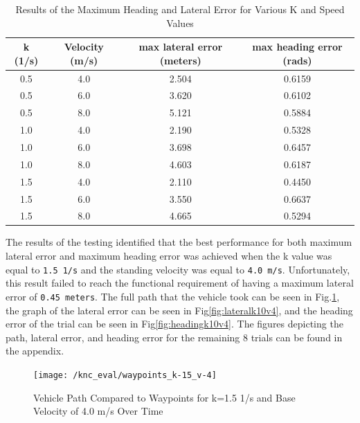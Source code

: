 \documentclass[titlepage,draft]{article}
\begin{document}
{\begin{table}
	\centering
	\begin{tabular}{| c | c | c | c |}
		\hline
		k (1/s) & Velocity (m/s) & max lateral error (meters) & max heading error (rads) \\ [0.5ex]
		\hline
		0.5     & 4.0            & 2.504                      & 0.6159                   \\
		\hline
		0.5     & 6.0            & 3.620                      & 0.6102                   \\
		\hline
		0.5     & 8.0            & 5.121                      & 0.5884                 \\
		\hline
		1.0     & 4.0            & 2.190                      & 0.5328                   \\
		\hline
		1.0     & 6.0            & 3.698                      & 0.6457                   \\
		\hline
		1.0     & 8.0            & 4.603                      & 0.6187                   \\
		\hline
		1.5     & 4.0            & 2.110                      & 0.4450                   \\
		\hline
		1.5     & 6.0            & 3.550                      & 0.6637                   \\
		\hline
		1.5     & 8.0            & 4.665                      & 0.5294                   \\
		\hline
	\end{tabular}
	\caption{Results of the Maximum Heading and Lateral Error for Various K and Speed Values}
	\label{tab:controller_test_values}
\end{table}

The results of the testing identified that the best performance for both maximum lateral error and maximum heading error was achieved when the k value was equal to \texttt{1.5 1/s} and the standing velocity was equal to \texttt{4.0 m/s}. Unfortunately, this result failed to reach the functional requirement of having a maximum lateral error of \texttt{0.45 meters}. The full path that the vehicle took can be seen in Fig.\ref{fig:waypointsk10v4}, the graph of the lateral error can be seen in Fig\ref{fig:lateralk10v4}, and the heading error of the trial can be seen in Fig\ref{fig:headingk10v4}. The figures depicting the path, lateral error, and heading error for the remaining 8 trials can be found in the appendix.

\begin{figure}
	\centering
	\texttt{[image: /knc\_eval/waypoints\_k-15\_v-4]}
	\caption{Vehicle Path Compared to Waypoints for k=1.5 1/s and Base Velocity of 4.0 m/s Over Time}
	\label{fig:waypointsk10v4}
\end{figure}

}
\end{document}
